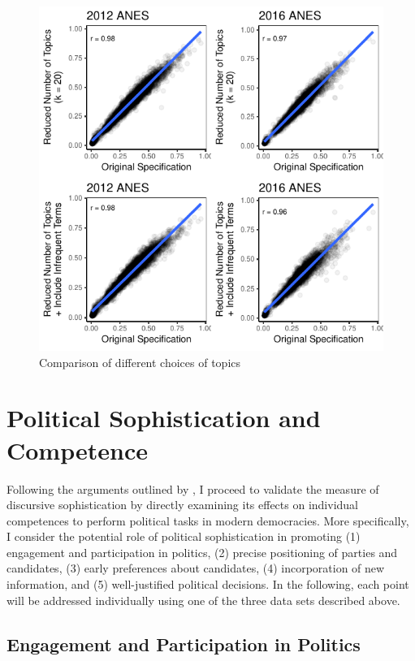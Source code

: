 \documentclass[12pt]{article}
\begin{document}
\begin{figure}[h]\centering
\includegraphics{../fig/pretext_robustness.pdf}
\caption{Comparison of different choices of topics}\label{fig:ktopic}
\end{figure}

\section*{Political Sophistication and Competence}

Following the arguments outlined by \citet{lupia2006elitism,lupia2015uninformed}, I proceed to validate the measure of discursive sophistication by directly examining its effects on individual competences to perform political tasks in modern democracies. More specifically, I consider the potential role of political sophistication in promoting (1) engagement and participation in politics, (2) precise positioning of parties and candidates, (3) early preferences about candidates, (4) incorporation of new information, and (5) well-justified political decisions. In the following, each point will be addressed individually using one of the three data sets described above.

\subsection*{Engagement and Participation in Politics}
\end{document}
